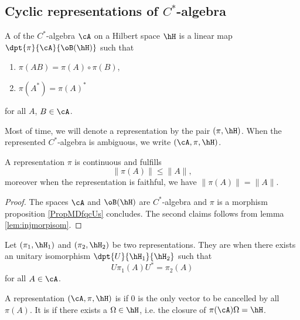 \subsection{Cyclic representations of \texorpdfstring{$C^*$}{C*}-algebra }

\begin{definition}
A  of the $C^*$-algebra $\cA$ on a Hilbert space $\hH$ is a linear map $\dpt{\pi}{\cA}{\oB(\hH)}$ such that

\begin{enumerate}
\item $\pi(AB)=\pi(A)\circ\pi(B)$,
\item $\pi(A^*)=\pi(A)^*$
\end{enumerate}
for all $A$, $B\in\cA$. 
\end{definition}
Most of time, we will denote a representation by the pair $(\pi,\hH)$. When the represented $C^*$-algebra is ambiguous, we write $(\cA,\pi,\hH)$.

\begin{lemma}       \label{Lemrepresnormpresou}
A representation $\pi$ is continuous and fulfills
\begin{equation}
\| \pi(A) \|\leq \| A \|,
\end{equation}
moreover when the representation is faithful, we have $\| \pi(A) \|=\| A \|$.
\end{lemma}

\begin{proof}
The spaces $\cA$ and $\oB(\hH)$ are $C^*$-algebra and $\pi$ is a morphism proposition \ref{PropMDfqcUs} concludes. The second claims follows from lemma \ref{lem:injmorpisom}.
\end{proof}

Let $(\pi_1,\hH_1)$ and $(\pi_2,\hH_2)$ be two representations. They are  when there exists an unitary isomorphism $\dpt{U}{\hH_1}{\hH_2}$ such that
\begin{equation}
  U\pi_1(A)U^*=\pi_2(A)
\end{equation}
for all $A\in\cA$.

A representation $(\cA,\pi,\hH)$ is  if $0$ is the only vector to be cancelled by all $\pi(A)$. It is  if there exists a  $\Omega\in\hH$, i.e. the closure of $\pi(\cA)\Omega=\hH$.


